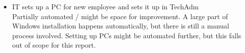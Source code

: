 \begin{itemize}
	\item{IT sets up a PC for new employee and sets it up in TechAdm}\\
		Partially automated / might be space for improvement. A large part of Windows installation happens automatically, but there is still a manual process involved.
		Setting up PCs might be automated further, but this falls out of scope for this report.
	
\end{itemize}